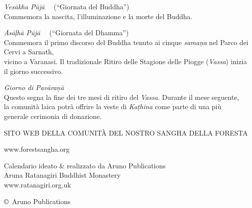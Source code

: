 {{\emph{Vesākha Pūjā} \spacedcdot\ \xDateVesakha\ (“Giornata del Buddha”)\\
Commemora la nascita, l'illuminazione e la morte del Buddha.

\emph{Āsāḷhā Pūjā} \spacedcdot\ \xDateAsalha\ (“Giornata del Dhamma”)\\
Commemora il primo discorso del Buddha tenuto ai cinque \emph{samaṇa} nel Parco dei Cervi a Sarnath,\\
vicino a Varanasi. Il tradizionale Ritiro delle Stagione delle Piogge (\emph{Vassa}) inizia il giorno successivo.

\emph{Giorno di Pavāraṇā} \spacedcdot\ \xDatePavarana\\
Questo segna la fine dei tre mesi di ritiro del \emph{Vassa}. Durante il mese seguente,\\
la comunità laica potrà offrire la veste di \emph{Kaṭhina} come parte di una più\\
generale cerimonia di donazione.

\bigskip

{\large SITO WEB DELLA COMUNITÀ DEL NOSTRO SANGHA DELLA FORESTA}

www.forestsangha.org

\bigskip

Calendario ideato \& realizzato da Aruno Publications\\
Aruna Ratanagiri Buddhist Monastery\\
www.ratanagiri.org.uk

\copyright\ Aruno Publications \CopyrightYear\\

\vfill
\mbox{}
}}


